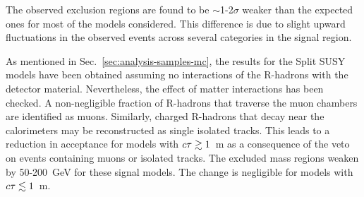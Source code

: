 The observed exclusion regions are found to be $\sim$1-2$\sigma$ weaker than 
the expected ones for most of the models considered. This difference is due to 
slight upward fluctuations in the observed events across several categories in 
the signal region.

As mentioned in Sec.~\ref{sec:analysis-samples-mc}, the results for the Split 
SUSY models have been obtained assuming no interactions of the R-hadrons with 
the detector material. Nevertheless, the effect of matter interactions has been 
checked. A 
non-negligible fraction of R-hadrons that traverse the muon chambers 
are identified as muons. Similarly, charged R-hadrons that decay near the 
calorimeters may be reconstructed as single isolated tracks. This leads to a 
reduction in acceptance for models with $c\tau \gtrsim 1$~m as a consequence of 
the veto on events containing muons or isolated tracks.
The excluded mass regions weaken by 50-200~GeV for these signal models. The 
change is negligible for models with $c\tau \lesssim 1$~m.

